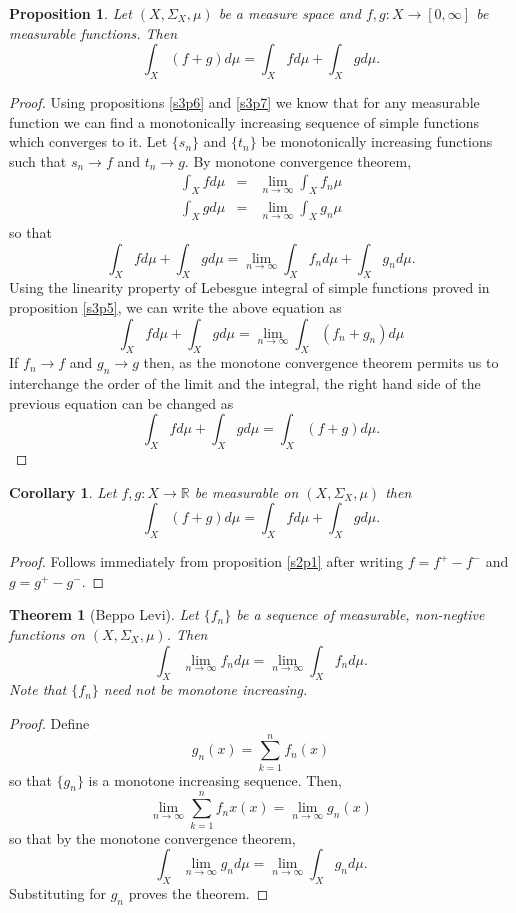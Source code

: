 \documentclass{article}
\newcommand{\sor}{\mathbb{R}}
\theoremstyle{plain}
\newtheorem{thm}{Theorem}
\numberwithin{thm}{section}
\theoremstyle{plain}
\newtheorem{prop}{Proposition}
\numberwithin{prop}{section}
\theoremstyle{definition}
\numberwithin{defn}{section}
\theoremstyle{remark}
\theoremstyle{plain}
\newtheorem{cor}{Corollary}
\numberwithin{cor}{section}
\numberwithin{equation}{section}
\begin{document}
\begin{prop}\label{s4p2}
Let $(X, \Sigma_X, \mu)$ be a measure space and $f, g: X \rightarrow [0, \infty]$
be measurable functions. Then
\[
\int_X(f + g)d\mu = \int_X f d\mu + \int_X g d\mu.
\]
\end{prop}
\begin{proof}
Using propositions \ref{s3p6} and \ref{s3p7} we know that for any measurable
function we can find a monotonically increasing sequence of simple functions
which converges to it. Let $\{s_n\}$ and $\{t_n\}$ be monotonically increasing
functions such that $s_n \rightarrow f$ and $t_n \rightarrow g$. By monotone
convergence theorem,
\begin{eqnarray*}
\int_X f d\mu &=& \lim_{n \rightarrow \infty} \int_X f_n \mu \\
\int_X g d\mu &=& \lim_{n \rightarrow \infty} \int_X g_n \mu
\end{eqnarray*}
so that
\[
\int_X fd\mu + \int_X gd\mu = \lim_{n \rightarrow \infty} \int_X f_n d\mu +
\int_X g_n d\mu.
\]
Using the linearity property of Lebesgue integral of simple functions proved in
proposition \ref{s3p5}, we can write the above equation as
\[
\int_X fd\mu + \int_X gd\mu = \lim_{n \rightarrow \infty} \int_X (f_n + g_n) d\mu
\]
If $f_n \rightarrow f$ and $g_n \rightarrow g$ then, as the monotone convergence
theorem permits us to interchange the order of the limit and the integral, the
right hand side of the previous equation can be changed as
\[
\int_X fd\mu + \int_X gd\mu = \int_X (f + g)d\mu.
\]
\end{proof}

\begin{cor}\label{s4c1}
Let $f, g: X \rightarrow \sor$ be measurable on $(X, \Sigma_X, \mu)$ then
\[
\int_X(f + g)d\mu = \int_X f d\mu + \int_X g d\mu.
\]
\end{cor}
\begin{proof}
Follows immediately from proposition \ref{s2p1} after writing $f = f^+ - f^-$
and $g = g^+ - g^-$.
\end{proof}

\begin{thm}[Beppo Levi]\label{s4t3}
Let $\{f_n\}$ be a sequence of measurable, non-negtive functions on $(X, 
\Sigma_X, \mu)$. Then
\[
\int_X \lim_{n \rightarrow \infty}f_n d\mu = 
\lim_{n \rightarrow \infty}\int_X f_n d\mu.
\]
Note that $\{f_n\}$ need not be monotone increasing.
\end{thm}
\begin{proof}
Define 
\[
g_n(x) = \sum_{k=1}^n f_n(x)
\]
so that $\{g_n\}$ is a monotone increasing sequence. Then,
\[
\lim_{n \rightarrow \infty}\sum_{k=1}^n f_nx(x) = \lim_{n \rightarrow \infty}g_n(x)
\]
so that by the monotone convergence theorem,
\[
\int_X \lim_{n \rightarrow \infty} g_n d\mu = \lim_{n \rightarrow \infty}\int_X
g_n d\mu.
\]
Substituting for $g_n$ proves the theorem.
\end{proof}
\end{document}
